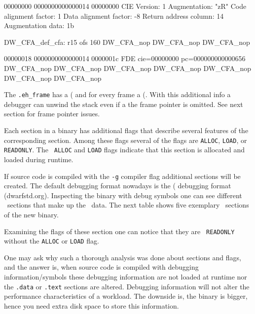 00000000 0000000000000014 00000000 CIE
  Version:               1
  Augmentation:          "zR"
  Code alignment factor: 1
  Data alignment factor: -8
  Return address column: 14
  Augmentation data:     1b

  DW_CFA_def_cfa: r15 ofs 160
  DW_CFA_nop
  DW_CFA_nop
  DW_CFA_nop

00000018 0000000000000014 0000001c FDE cie=00000000 pc=000000000000656
  DW_CFA_nop
  DW_CFA_nop
  DW_CFA_nop
  DW_CFA_nop
  DW_CFA_nop
  DW_CFA_nop
  DW_CFA_nop
\stoptyping

The { \tt .eh_frame} has a  (\CIE\) and for every frame a
 (\FDE\). With this additional info a debugger can unwind
the stack even if a the frame pointer is omitted. See next section for
frame pointer issues.

Each section in a binary has additional flags that describe several
features of the corresponding section. Among these flags several of
the flags are {\tt ALLOC}, {\tt LOAD}, or {\tt READONLY}. The {\tt
  ALLOC} and {\tt LOAD} flags indicate that this section is allocated
and loaded during runtime.

If source code is compiled with the {\tt -g} compiler flag additional
sections will be created. The default debugging format nowadays is the
 (\DWARF\) debugging format (dwarfstd.org). Inspecting
the binary with debug symbols one can see different \DWARF\ sections
that make up the \DWARF\ data. The next table shows five exemplary
\DWARF\ sections of the new binary.




Examining the flags of these section one can notice that they are {\tt
  READONLY} without the {\tt ALLOC} or {\tt LOAD} flag.

One may ask why such a thorough analysis was done about sections and
flags, and the answer is, when source code is compiled with debugging
information/symbols these debugging information are not loaded at
runtime nor the {\tt .data} or {\tt .text} sections are altered. Debugging
information will not alter the performance characteristics of a
workload. The downside is, the binary is bigger, hence you need extra
disk space to store this information.

